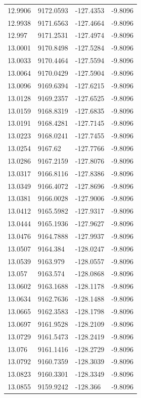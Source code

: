 \begin{table}[H]
\begin{tabular}{llll}
12.9906 & 9172.0593 & -127.4353 & -9.8096 \\
12.9938 & 9171.6563 & -127.4664 & -9.8096 \\
12.997 & 9171.2531 & -127.4974 & -9.8096 \\
13.0001 & 9170.8498 & -127.5284 & -9.8096 \\
13.0033 & 9170.4464 & -127.5594 & -9.8096 \\
13.0064 & 9170.0429 & -127.5904 & -9.8096 \\
13.0096 & 9169.6394 & -127.6215 & -9.8096 \\
13.0128 & 9169.2357 & -127.6525 & -9.8096 \\
13.0159 & 9168.8319 & -127.6835 & -9.8096 \\
13.0191 & 9168.4281 & -127.7145 & -9.8096 \\
13.0223 & 9168.0241 & -127.7455 & -9.8096 \\
13.0254 & 9167.62 & -127.7766 & -9.8096 \\
13.0286 & 9167.2159 & -127.8076 & -9.8096 \\
13.0317 & 9166.8116 & -127.8386 & -9.8096 \\
13.0349 & 9166.4072 & -127.8696 & -9.8096 \\
13.0381 & 9166.0028 & -127.9006 & -9.8096 \\
13.0412 & 9165.5982 & -127.9317 & -9.8096 \\
13.0444 & 9165.1936 & -127.9627 & -9.8096 \\
13.0476 & 9164.7888 & -127.9937 & -9.8096 \\
13.0507 & 9164.384 & -128.0247 & -9.8096 \\
13.0539 & 9163.979 & -128.0557 & -9.8096 \\
13.057 & 9163.574 & -128.0868 & -9.8096 \\
13.0602 & 9163.1688 & -128.1178 & -9.8096 \\
13.0634 & 9162.7636 & -128.1488 & -9.8096 \\
13.0665 & 9162.3583 & -128.1798 & -9.8096 \\
13.0697 & 9161.9528 & -128.2109 & -9.8096 \\
13.0729 & 9161.5473 & -128.2419 & -9.8096 \\
13.076 & 9161.1416 & -128.2729 & -9.8096 \\
13.0792 & 9160.7359 & -128.3039 & -9.8096 \\
13.0823 & 9160.3301 & -128.3349 & -9.8096 \\
13.0855 & 9159.9242 & -128.366 & -9.8096 \\

\end{tabular}
\end{table}
